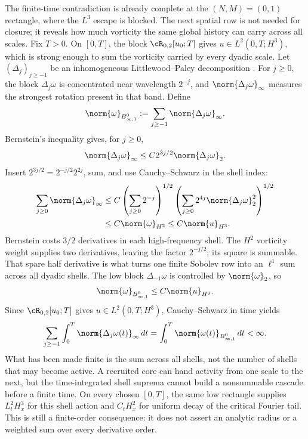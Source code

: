 The finite-time contradiction is already complete at the \((N,M)=(0,1)\) rectangle, where the \(L^3\) escape is blocked.
The next spatial row is not needed for closure; it reveals how much vorticity the same global history can carry across all scales.
Fix \(T>0\).
On \([0,T]\), the block \(\cR_{0,2}[u_0;T]\) gives \(u\in L^2(0,T;H^3)\), which is strong enough to sum the vorticity carried by every dyadic scale.
Let \((\Delta_j)_{j\geq-1}\) be an inhomogeneous Littlewood--Paley decomposition \parencite[Chapter~2]{BahouriCheminDanchin2011}.
For \(j\geq0\), the block \(\Delta_j\omega\) is concentrated near wavelength \(2^{-j}\), and \(\norm{\Delta_j\omega}_\infty\) measures the strongest rotation present in that band.
Define
\[
  \norm{\omega}_{B^0_{\infty,1}}
  :=\sum_{j\geq-1}\norm{\Delta_j\omega}_\infty.
\]
Bernstein's inequality \parencite[Chapter~2]{BahouriCheminDanchin2011} gives, for \(j\geq0\),
\[
  \norm{\Delta_j\omega}_\infty
  \leq C2^{3j/2}\norm{\Delta_j\omega}_2.
\]
Insert \(2^{3j/2}=2^{-j/2}2^{2j}\), sum, and use Cauchy--Schwarz in the shell index:
\begin{align*}
  \sum_{j\geq0}\norm{\Delta_j\omega}_\infty
  &\leq
  C\left(\sum_{j\geq0}2^{-j}\right)^{1/2}
  \left(\sum_{j\geq0}2^{4j}\norm{\Delta_j\omega}_2^2\right)^{1/2}
  \\
  &\leq C\norm{\omega}_{H^2}
  \leq C\norm{u}_{H^3}.
\end{align*}
Bernstein costs \(3/2\) derivatives in each high-frequency shell.  The \(H^2\)
vorticity weight supplies two derivatives, leaving the factor \(2^{-j/2}\); its square
is summable.  That spare half derivative is what turns one finite Sobolev row into an
\(\ell^1\) sum across all dyadic shells.
The low block \(\Delta_{-1}\omega\) is controlled by \(\norm{\omega}_2\), so
\begin{equation}\label{eq:VorticityBesovFromHThree}
  \norm{\omega}_{B^0_{\infty,1}}
  \leq C\norm{u}_{H^3}.
\end{equation}
Since \(\cR_{0,2}[u_0;T]\) gives \(u\in L^2(0,T;H^3)\), Cauchy--Schwarz in time yields
\begin{equation}\label{eq:FiniteDyadicVorticityAction}
  \sum_{j\geq-1}
  \int_0^{T}\norm{\Delta_j\omega(t)}_\infty\,dt
  =\int_0^{T}\norm{\omega(t)}_{B^0_{\infty,1}}\,dt
  <\infty.
\end{equation}
What has been made finite is the sum across all shells, not the number of shells that
may become active.  A recruited core can hand activity from one scale to the next, but
the time-integrated shell suprema cannot build a nonsummable cascade before a finite
time.  On every chosen \([0,T]\), the same low rectangle supplies \(L^2_tH^3_x\) for
this shell action and \(C_tH^2_x\) for uniform decay of the critical Fourier tail.
This is still a finite-order consequence:
it does not assert an analytic radius or a weighted sum over every derivative order.

